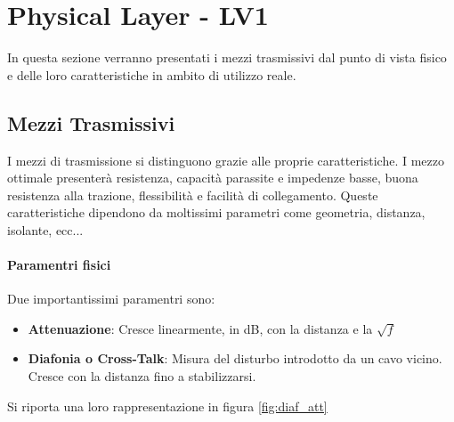 \documentclass[12pt]{article}
\begin{document}
\section{Physical Layer - LV1} \label{LV1} %
In questa sezione verranno presentati i mezzi trasmissivi dal punto di vista fisico e delle loro caratteristiche in ambito di utilizzo reale.
\subsection{Mezzi Trasmissivi}
I mezzi di trasmissione si distinguono grazie alle proprie caratteristiche. I mezzo ottimale presenterà resistenza, capacità parassite e impedenze basse, buona resistenza alla trazione, flessibilità e facilità di collegamento. Queste caratteristiche dipendono da moltissimi parametri come geometria, distanza, isolante, ecc...
\paragraph{Paramentri fisici}
Due importantissimi paramentri sono:
\begin{itemize}
  \item \textbf{Attenuazione}: Cresce linearmente, in dB, con la distanza e la $\sqrt{f}$
  \item \textbf{Diafonia o Cross-Talk}: Misura del disturbo introdotto da un cavo vicino. Cresce con la distanza fino a stabilizzarsi.
\end{itemize}
Si riporta una loro rappresentazione in figura \ref{fig:diaf_att}
\end{document}
